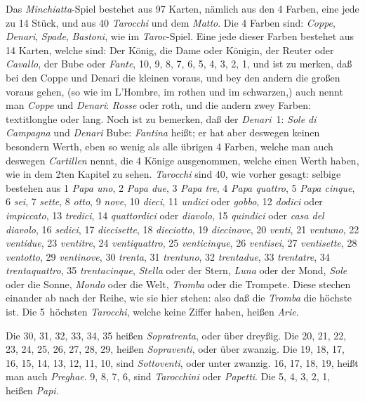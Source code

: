 \documentclass[11pt,a6paper,twoside]{article}
\begin{document}
Das \textit{Minchiatta}-Spiel bestehet aus 97 Karten, nämlich aus den 4 Farben, eine jede zu 14 Stück, und aus 40 \textit{Tarocchi} und dem \textit{Matto}. Die 4 Farben sind: \textit{Coppe}, \textit{Denari}, \textit{Spade}, \textit{Bastoni}, wie im \textit{Taroc}-Spiel. Eine jede dieser Farben bestehet aus 14 Karten, welche sind: Der König, die Dame oder Königin, der Reuter oder \textit{Cavallo}, der Bube oder \textit{Fante}, 10, 9, 8, 7, 6, 5, 4, 3, 2, 1, und ist zu merken, daß bei den Coppe und Denari die kleinen voraus, und bey den andern die großen voraus gehen, (so wie im L'Hombre, im rothen und im schwarzen,) auch nennt man \textit{Coppe} und \textit{Denari}: \mbox{\textit{Rosse}} oder roth, und die andern zwey Farben: \mbox{textit{longhe}} oder lang. Noch ist zu bemerken, daß der \textit{Denari}~1: \textit{Sole di Campagna} und \textit{Denari} Bube: \textit{Fantina} heißt; er hat aber deswegen keinen besondern Werth, eben so wenig als alle übrigen 4 Farben, welche man auch deswegen \textit{Cartillen} nennt, die 4 Könige ausgenommen, welche einen Werth haben, wie in dem 2ten Kapitel zu sehen. \textit{Tarocchi} sind 40, wie vorher gesagt: selbige bestehen aus
1 \textit{Papa uno}, 2 \textit{Papa due}, 3 \textit{Papa tre}, 4 \textit{Papa quattro}, 5 \textit{Papa cinque}, 6 \textit{sei}, 7 \textit{sette}, 8 \textit{otto}, 9 \textit{nove}, 10 \textit{dieci}, 11 \textit{undici} oder \textit{gobbo}, 12 \textit{dodici} oder \textit{impiccato}, 13 \textit{tredici}, 14 \textit{quattordici} oder \textit{diavolo}, 15 \textit{quindici} oder \textit{casa del diavolo}, 16 \textit{sedici}, 17 \textit{diecisette}, 18 \textit{dieciotto}, 19 \textit{diecinove}, 20 \textit{venti}, 21 \textit{ventuno}, 22 \textit{ventidue}, 23 \textit{ventitre}, 24 \textit{ventiquattro}, 25 \textit{venticinque}, 26 \textit{ventisei}, 27 \textit{ventisette}, 28 \textit{ventotto}, 29 \textit{ventinove}, 30 \textit{trenta}, 31 \textit{trentuno}, 32 \textit{trentadue}, 33 \textit{trentatre}, 34 \textit{trentaquattro}, 35 \textit{trentacinque}, \textit{Stella} oder der Stern, \textit{Luna} oder der Mond, \textit{Sole} oder die Sonne, \textit{Mondo} oder die Welt, \textit{Tromba} oder die Trompete. Diese stechen einander ab nach der Reihe, wie sie hier stehen: also daß die \textit{Tromba} die höchste ist. Die 5~höchsten \textit{Tarocchi}, welche keine Ziffer haben, heißen \textit{Arie}.

Die 30, 31, 32, 33, 34, 35 heißen \textit{Sopratrenta}, oder über dreyßig. Die 20, 21, 22, 23, 24, 25, 26, 27, 28, 29, heißen \textit{Sopraventi}, oder über zwanzig. Die 19, 18, 17, 16, 15, 14, 13, 12, 11, 10, sind \textit{Sottoventi}, oder unter zwanzig. 16, 17, 18, 19, heißt man auch \textit{Preghae}. 9, 8, 7, 6, sind \textit{Tarocchini} oder \textit{Papetti}. Die 5, 4, 3, 2, 1, heißen \textit{Papi}.
\end{document}
